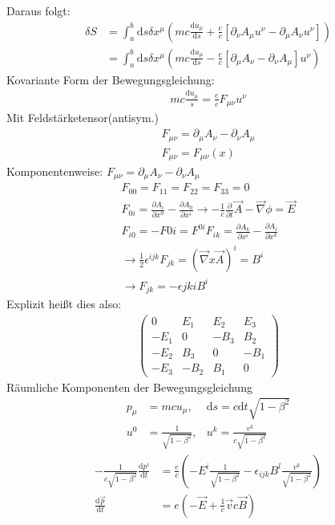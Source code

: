 \documentclass[a4paper]{article}
\begin{document}
Daraus folgt:
\begin{align}
\delta S &= \int_a^b \mathrm{d}s \delta x^\mu \left( mc\frac{\mathrm{d}u_\mu}{\mathrm{d}s} +
\frac{e}{c} \left[ \partial_\nu A_\mu u^\nu - \partial_\mu A_\nu u^\nu
\right]\right)\\
&=\int_a^b \mathrm{d}s \delta x^\mu \left( mc\frac{\mathrm{d}u_\mu}{\mathrm{d}s} -
\frac{e}{c} \left[ \partial_\mu A_\nu - \partial_\nu A_\mu \right] u^\nu
\right)
\end{align}
Kovariante Form der Bewegungsgleichung:
\begin{align}
mc\frac{\mathrm{d}u_\mu}{s}=\frac{e}{c}F_{\mu\nu}u^\nu
\end{align}
Mit Feldstärketensor(antisym.)
\begin{align}
F_{\mu\nu}=\partial_\mu A_\nu - \partial_\nu A_\mu\\
F_{\mu\nu}=F_{\mu\nu}(x)
\end{align}
Komponentenweise: $F_{\mu\nu}=\partial_\mu A_\nu - \partial_\nu A_\mu$\\
\begin{align}
F_{00}=F_{11}=F_{22}=F_{33}=0\\
F_{0i}=\frac{\partial A_i}{\partial x^0}-\frac{\partial A_0}{\partial x^i}
\rightarrow -\frac{1}{c}\frac{\partial}{\partial
t}\vec{A}-\vec{\nabla}\phi=\vec{E}\\
F_{i0}=-F{0i}=F^{0i}
F_{ik}=\frac{\partial A_k}{\partial x^i}-\frac{\partial A_i}{\partial x^k}\\
\rightarrow \frac{1}{2}\epsilon^{ijk}F_{jk}=(\vec{\nabla}x\vec{A})^i=B^i\\
\rightarrow F_{jk}=-\epsilon{jki}B^i
\end{align}
Explizit heißt dies also:
\begin{align}
\begin{pmatrix}
0 & E_1 & E_2 & E_3\\
-E_1 &0&-B_3&B_2 \\
-E_2 &B_3&0&-B_1\\
-E_3 &-B_2&B_1&0
\end{pmatrix}
\end{align}
Räumliche Komponenten der Bewegungsgleichung
\begin{align}
p_\mu&=mcu_\mu , &\mathrm{d}s=c\mathrm{d}t\sqrt{1-\beta^2}\\
u^0&=\frac{1}{\sqrt{1-\beta^2}} , &u^k=\frac{v^k}{c\sqrt{1-\beta^2}}
\end{align}
\begin{align}
-\frac{1}{c\sqrt{1-\beta^2}}\frac{\mathrm{d}p^i}{\mathrm{d}t}&=\frac{e}{c}\left(-E^i
\frac{1}{\sqrt{1-\beta^2}}-\epsilon_{ijk}B^l\frac{v^k}{\sqrt{1-\beta^2}}\right)\\
\frac{\mathrm{d}\vec{p}}{\mathrm{d}t}&=e\left(-\vec{E}+\frac{1}{c}\vec{v}c\vec{B}\right)
\end{align}
\end{document}
